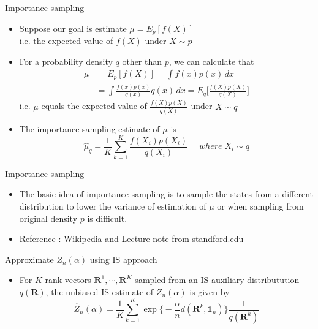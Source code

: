\documentclass[11pt]{beamer}
\begin{document}
\begin{frame}{Importance sampling}
\begin{itemize}
    \item Suppose our goal is estimate $\mu=E_p[f(X)]$ \\ i.e. the expected value of $f(X)$ under $X\sim p$
    \item For a probability density $q$ other than $p$, we can calculate that 
    \begin{align*} 
        \mu &=E_p[f(X)]=\int f(x)p(x)\, dx \\ &=\int \frac{f(x)p(x)}{q(x)}q(x)\,dx=E_q\Big[\frac{f(X)p(X)}{q(X)}\Big] 
    \end{align*} 
    i.e. $\mu$ equals the expected value of $\frac{f(X)p(X)}{q(X)}$ under $X\sim q$
    \item The importance sampling estimate of $\mu$ is $$\hat \mu_q =\frac{1}{K}\sum_{k=1}^K \frac{f(X_i)p(X_i)}{q(X_i)} \quad \; where \; X_i\sim q$$
\end{itemize}
\end{frame}

\begin{frame}{Importance sampling}
\begin{itemize}
    \item The basic idea of importance sampling is to sample the states from a different distribution to lower the variance of estimation of $\mu$ or when sampling from original density $p$ is difficult.
    \item Reference : Wikipedia and \href{https://statweb.stanford.edu/~owen/mc/Ch-var-is.pdf}{Lecture note from standford.edu}
\end{itemize}
\end{frame}

\begin{frame}{Approximate $Z_n(\alpha)$ using IS approach}
\begin{itemize}
    \item For $K$ rank vectors $\mathbf{R}^1,\cdots, \mathbf{R}^K$ sampled from an IS auxiliary distributution $q(\mathbf{R})$, the unbiased IS estimate of $Z_n(\alpha)$ is given by 
    \begin{equation} \label{ISapproximate}
        \hat{Z}_n(\alpha)=\frac{1}{K}\sum_{k=1}^K \exp\big\{-\frac{\alpha}{n}d(\mathbf{R}^k, \mathbf{1}_n) \big\}\frac{1}{q(\mathbf{R}^k)}
    \end{equation} 
\end{itemize}
\end{frame}
\end{document}
